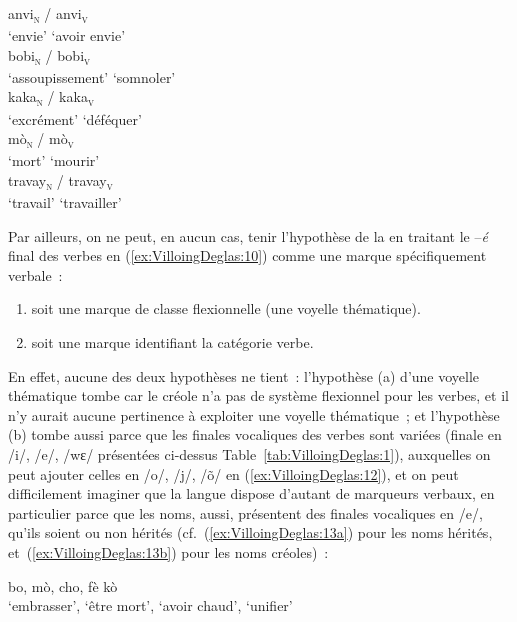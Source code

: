 \documentclass[output=paper]{langsci/langscibook}
\begin{document}
  \ea \gll anvi\textsubscript{\textsc{n}} / anvi\textsubscript{\textsc{v}}\\
  {`envie'} {} {`avoir envie'}\\
  \ex \gll bobi\textsubscript{\textsc{n}} / bobi\textsubscript{\textsc{v}}\\
  {`assoupissement'} {} {`somnoler'}\\
  \ex \gll kaka\textsubscript{\textsc{n}} / kaka\textsubscript{\textsc{v}}\\
  {`excrément'} {} {`déféquer'}\\
  \ex \gll mò\textsubscript{\textsc{n}} / mò\textsubscript{\textsc{v}}\\
  {`mort'} {} {`mourir'}\\
  \ex \gll travay\textsubscript{\textsc{n}} / travay\textsubscript{\textsc{v}}\\
  {`travail'} {} {`travailler'}\\
  \z
  \z
\z

Par ailleurs, on ne peut, en aucun cas, tenir l'hypothèse de la
 en traitant le --\emph{é} final des verbes en (\ref{ex:VilloingDeglas:10}) comme une
marque spécifiquement verbale~:

\begin{enumerate}[label=(\alph*)]
\item soit une marque de classe flexionnelle (une voyelle thématique).

\item soit une marque identifiant la catégorie verbe.
\end{enumerate}

En effet, aucune des deux hypothèses ne tient~: l'hypothèse (a) d'une
voyelle thématique tombe car le créole n'a pas de système flexionnel
pour les verbes, et il n'y aurait aucune pertinence à exploiter une
voyelle thématique~; et l'hypothèse (b) tombe aussi parce que les
finales vocaliques des verbes sont variées (finale en /i/, /e/, /wɛ/
présentées ci-dessus Table~\ref{tab:VilloingDeglas:1}), auxquelles on peut ajouter celles en
/o/, /j/, /õ/ en (\ref{ex:VilloingDeglas:12}), et on peut difficilement imaginer que la langue
dispose d'autant de marqueurs verbaux, en particulier parce que les
noms, aussi, présentent des finales vocaliques en /e/, qu'ils soient ou
non hérités (cf.~(\ref{ex:VilloingDeglas:13a}) pour les noms hérités, et~(\ref{ex:VilloingDeglas:13b}) pour les noms
créoles)~:

\ea\label{ex:VilloingDeglas:12}
  \ea\label{ex:VilloingDeglas:12a} \gll bo, mò, cho, {fè kò}\\
  `embrasser', {`être mort'}, {`avoir chaud'}, {`unifier'}\\
\end{document}
